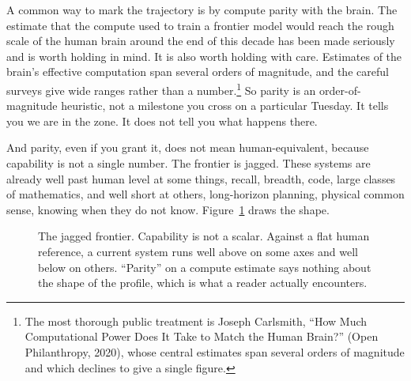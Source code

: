 A common way to mark the trajectory is by compute parity with the brain. The estimate that the compute used to train a frontier model would reach the rough scale of the human brain around the end of this decade has been made seriously and is worth holding in mind. It is also worth holding with care. Estimates of the brain's effective computation span several orders of magnitude, and the careful surveys give wide ranges rather than a number.\footnote{The most thorough public treatment is Joseph Carlsmith, ``How Much Computational Power Does It Take to Match the Human Brain?'' (Open Philanthropy, 2020), whose central estimates span several orders of magnitude and which declines to give a single figure.} So parity is an order-of-magnitude heuristic, not a milestone you cross on a particular Tuesday. It tells you we are in the zone. It does not tell you what happens there.

And parity, even if you grant it, does not mean human-equivalent, because capability is not a single number. The frontier is jagged. These systems are already well past human level at some things, recall, breadth, code, large classes of mathematics, and well short at others, long-horizon planning, physical common sense, knowing when they do not know. Figure~\ref{fig:jagged} draws the shape.

\begin{figure}[h]
\centering
{}
\caption{The jagged frontier. Capability is not a scalar. Against a flat human reference, a current system runs well above on some axes and well below on others. ``Parity'' on a compute estimate says nothing about the shape of the profile, which is what a reader actually encounters.}
\label{fig:jagged}
\end{figure}

